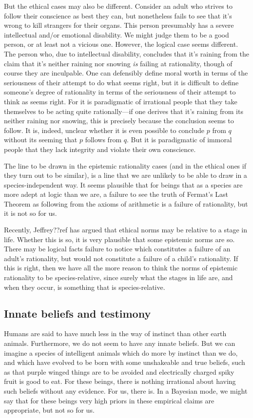 But the ethical cases may also be different. Consider an adult who strives to follow their conscience as best they can,
but nonetheless fails to see that it's wrong to kill strangers for their organs. This person presumably has
a severe intellectual and/or emotional disability. We might judge them to be a good person, or at least not a vicious one. 
However, the logical case seems different. The person who, due to intellectual disability, concludes that it's raining 
from the claim that it's neither raining nor snowing \textit{is} failing at rationality, though of course they are 
inculpable. One can defensibly define moral worth in terms of the seriousness of their attempt to do what seems right, but
it is difficult to define someone's degree of rationality in terms of the seriousness of their attempt to think as seems
right. For it is paradigmatic of irrational people that they take themselves to be acting quite rationally---if one
derives that it's raining from its neither raining nor snowing, this is precisely because the conclusion seems to follow.
It is, indeed, unclear whether it is even possible to conclude $p$ from $q$ without its seeming that $p$ follows from $q$.
But it is paradigmatic of immoral people that they lack integrity and violate their own conscience. 

The line to be drawn in the epistemic rationality cases (and in the ethical ones if they turn out to be similar), is a line that we 
are unlikely to be able to draw in a species-independent way. It seems plausible that for beings that as a species are 
more adept at logic than we are, a failure to see the truth of Fermat's Last Theorem as following from the axioms of
arithmetic is a failure of rationality, but it is not so for us. 

Recently, Jeffrey??ref has argued that ethical norms may be relative to a stage in life. Whether this is so, it is very
plausible that some epistemic norms are so. There may be logical facts failure to notice which constitutes a failure of 
an adult's rationality, but would not constitute a failure of a child's rationality. If this is right, then we have all
the more reason to think the norms of epistemic rationality to be species-relative, since surely what the stages in 
life are, and when they occur, is something that is species-relative.

\subsection{Innate beliefs and testimony}
Humans are said to have much less in the way of instinct than other earth animals. Furthermore, we do not seem to
have any innate beliefs. But we can imagine a species of intelligent animals which do more by instinct than we do,
and which have evolved to be born with some unshakeable and true beliefs, such as that purple winged things are to 
be avoided and electrically charged spiky fruit is good to eat. For these beings, there is nothing irrational about 
having such beliefs without any evidence. For us, there is. In a Bayesian mode, we might say that for these
beings very high priors in these empirical claims are appropriate, but not so for us. 

